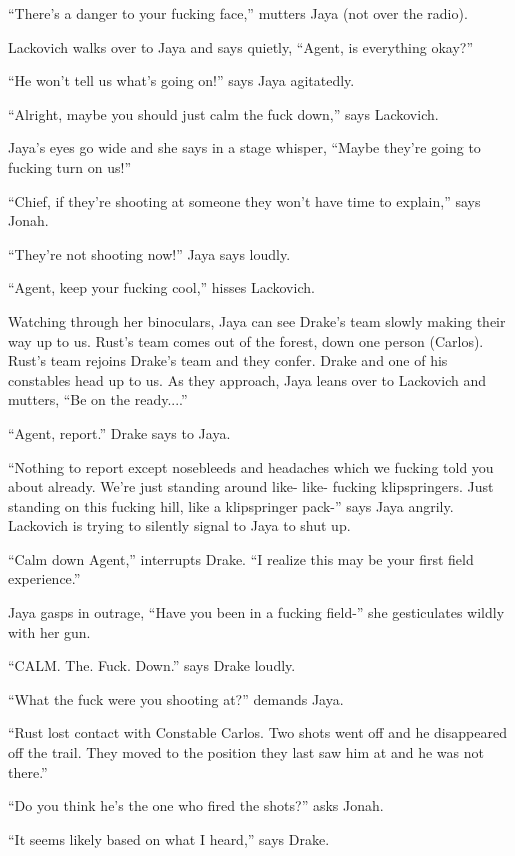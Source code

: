 ``There's a danger to your fucking face,'' mutters Jaya (not over the radio).

Lackovich walks over to Jaya and says quietly, ``Agent, is everything okay?''

``He won't tell us what's going on!'' says Jaya agitatedly.

``Alright, maybe you should just calm the fuck down,'' says Lackovich.

Jaya's eyes go wide and she says in a stage whisper, ``Maybe they're going to fucking turn on us!''

``Chief, if they're shooting at someone they won't have time to explain,'' says Jonah.

``They're not shooting now!'' Jaya says loudly.

``Agent, keep your fucking cool,'' hisses Lackovich.

 

Watching through her binoculars, Jaya can see Drake's team slowly making their way up to us.  Rust's team comes out of the forest, down one person (Carlos).  Rust's team rejoins Drake's team and they confer.  Drake and one of his constables head up to us.  As they approach, Jaya leans over to Lackovich and mutters, ``Be on the ready....''

``Agent, report.'' Drake says to Jaya.

``Nothing to report except nosebleeds and headaches which we fucking told you about already.  We're just standing around like- like- fucking klipspringers.  Just standing on this fucking hill, like a klipspringer pack-'' says Jaya angrily.  Lackovich is trying to silently signal to Jaya to shut up.

``Calm down Agent,'' interrupts Drake.  ``I realize this may be your first field experience.''

Jaya gasps in outrage,  ``Have you been in a fucking field-'' she gesticulates wildly with her gun.

``CALM.  The. Fuck. Down.'' says Drake loudly.

``What the fuck were you shooting at?'' demands Jaya.

``Rust lost contact with Constable Carlos.  Two shots went off and he disappeared off the trail. They moved to the position they last saw him at and he was not there.''

``Do you think he's the one who fired the shots?'' asks Jonah.

``It seems likely based on what I heard,'' says Drake.

